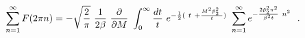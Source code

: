 \begin{equation}
\sum _{n=1}^{\infty} F(2\pi n) = - \sqrt {\frac{2}{\pi}}~\frac {1}{2\beta}
~\frac {\partial}{\partial M}~ \int_{0}^{\infty} \frac {dt}{t}~
e^{ -\frac {1}{2}(~t ~+ \frac {M^2 \tilde p_{2}^{2}~}{t})  } ~
\sum _{n=1}^{\infty}e^{-\frac {2\tilde p_{2}^{2} \pi^2}{\beta^2 t}~n^2}~~.\\
\end{equation}

